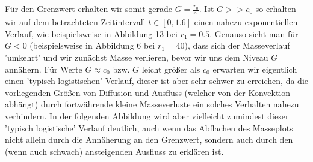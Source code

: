 Für den Grenzwert erhalten wir somit gerade $G = \frac{r_0}{r_1}$.
Ist $G >> c_0 $ so erhalten wir auf dem betrachteten Zeitintervall $t \in [0,1.6]$ einen nahezu exponentiellen Verlauf, wie beispielsweise in  Abbildung 13 bei $r_1 = 0.5$. Genauso sieht man für $G<0$ (beispielsweise in Abbildung 6 bei $r_1 = 40$), dass sich der Masseverlauf 'umkehrt' und wir zunächst Masse verlieren, bevor wir uns dem Niveau $G$ annähern.
Für Werte $G \approx c_0 $ bzw. $G$ leicht größer als $c_0$ erwarten wir eigentlich einen 'typisch logistischen' Verlauf, dieser ist aber sehr schwer zu erreichen, da die vorliegenden Größen von Diffusion und Ausfluss (welcher von der Konvektion abhängt) durch fortwährende kleine Masseverluste ein solches Verhalten nahezu verhindern.
\newline
In der folgenden Abbildung wird aber vielleicht zumindest dieser 'typisch logistische' Verlauf deutlich, auch wenn das Abflachen des Masseplots nicht allein durch die Annäherung an den Grenzwert, sondern auch durch den (wenn auch schwach) ansteigenden Ausfluss zu erklären ist. 
\begin{figure}[H]
	\centering
\end{figure}

